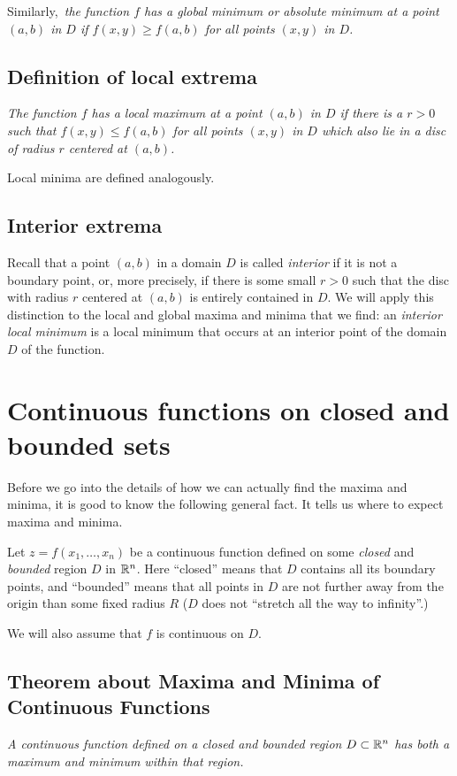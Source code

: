 \upshape%
Similarly,\itshape\ the function $f$ has a \emph{global minimum} or
\emph{absolute minimum} at a point $(a,b)$ in $D$ if $f(x,y)\geq f(a,b)$ for all
points $(x,y)$ in $D$.

\subsection{Definition of local extrema}     

\label{sec:def-local-extrema}\itshape 
The function $f$ has a \emph{local maximum} at a point $(a,b)$ in $D$ if there
is a $r>0$ such that $f(x,y)\leq f(a,b)$ for all points $(x,y)$ in $D$ which
also lie in a disc of radius $r$ centered at $(a,b)$.  \upshape

Local minima are defined analogously.

\subsection{Interior extrema}     

\label{sec:interior-extrema} 
Recall that a point $(a,b)$ in a domain $D$ is called \emph{interior} if it is
not a boundary point, or, more precisely, if there is some small $r>0$ such that
the disc with radius $r$ centered at $(a,b)$ is entirely contained in $D$.  We
will apply this distinction to the local and global maxima and minima that we
find: an \emph{interior local minimum} is a local minimum that occurs at an
interior point of the domain $D$ of the function.


\section{Continuous functions on closed and bounded sets}     
Before we go into the details of how we can actually find the maxima and minima,
it is good to know the following general fact. It tells us where to expect
maxima and minima.

Let $z=f(x_1,\ldots,x_n)$ be a continuous function defined on some \emph{closed} and
\emph{bounded} region $D$ in $\mathbb{R}^n$.  Here ``closed'' means that $D$ contains all its
boundary points, and ``bounded'' means that all points in $D$ are not further away
from the origin than some fixed radius $R$ ($D$ does not ``stretch all the way to
infinity''.)

We will also assume that $f$ is continuous on $D$.

\subsection{Theorem about Maxima and Minima of Continuous Functions}     
\label{thm:maxmin-exist}%
\itshape%
A continuous function defined on a closed and bounded region $D\subset \mathbb{R}^n$ has
both a maximum and minimum within that region.  \upshape

